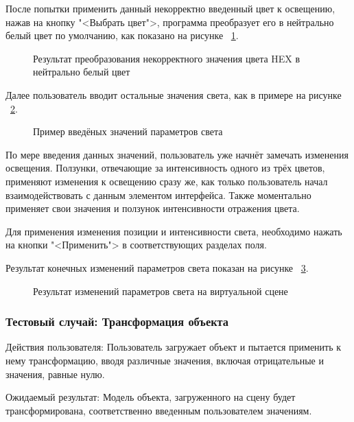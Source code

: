 После попытки применить данный некорректно введенный цвет к освещению, нажав на кнопку "<Выбрать цвет">, программа преобразует его в нейтрально белый цвет по умолчанию, как показано на рисунке ~\ref{screen18:image}.

\begin{figure}[H]
	\caption{Результат преобразования некорректного значения цвета HEX в нейтрально белый цвет}
	\label{screen18:image}
\end{figure}

Далее пользователь вводит остальные значения света, как в примере на рисунке ~\ref{screen16:image}.

\begin{figure}[H]
	\caption{Пример введёных значений параметров света}
	\label{screen16:image}
\end{figure}

По мере введения данных значений, пользователь уже начнёт замечать изменения освещения. Ползунки, отвечающие за интенсивность одного из трёх цветов, применяют изменения к освещению сразу же, как только пользователь начал взаимодействовать с данным элементом интерфейса. Также моментально применяет свои значения и ползунок интенсивности отражения цвета.

Для применения изменения позиции и интенсивности света, необходимо нажать на кнопки "<Применить"> в соответствующих разделах поля.

Результат конечных изменений параметров света показан на рисунке ~\ref{screen19:image}.

\begin{figure}[H]
	\caption{Результат изменений параметров света на виртуальной сцене}
	\label{screen19:image}
\end{figure}

\subsubsection{Тестовый случай: Трансформация объекта}
Действия пользователя: Пользователь загружает объект и пытается применить к нему трансформацию, вводя различные значения, включая отрицательные и значения, равные нулю.

Ожидаемый результат: Модель объекта, загруженного на сцену будет трансформирована, соответственно введенным пользователем значениям.

